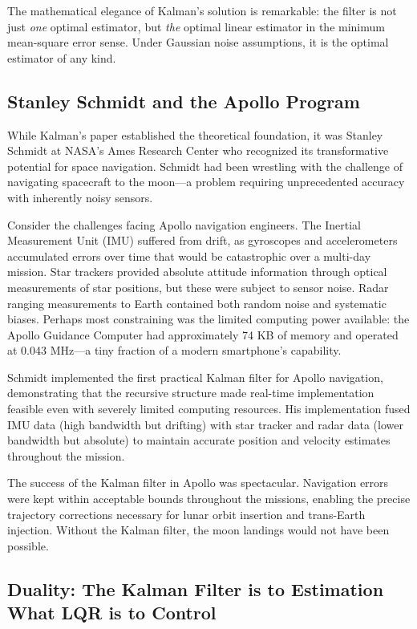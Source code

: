 The mathematical elegance of Kalman's solution is remarkable: the filter is not just \textit{one} optimal estimator, but \textit{the} optimal linear estimator in the minimum mean-square error sense. Under Gaussian noise assumptions, it is the optimal estimator of any kind.

\subsection{Stanley Schmidt and the Apollo Program}

While Kalman's paper established the theoretical foundation, it was Stanley Schmidt at NASA's Ames Research Center who recognized its transformative potential for space navigation. Schmidt had been wrestling with the challenge of navigating spacecraft to the moon---a problem requiring unprecedented accuracy with inherently noisy sensors.

Consider the challenges facing Apollo navigation engineers. The Inertial Measurement Unit (IMU) suffered from drift, as gyroscopes and accelerometers accumulated errors over time that would be catastrophic over a multi-day mission. Star trackers provided absolute attitude information through optical measurements of star positions, but these were subject to sensor noise. Radar ranging measurements to Earth contained both random noise and systematic biases. Perhaps most constraining was the limited computing power available: the Apollo Guidance Computer had approximately 74 KB of memory and operated at 0.043 MHz---a tiny fraction of a modern smartphone's capability.

Schmidt implemented the first practical Kalman filter for Apollo navigation, demonstrating that the recursive structure made real-time implementation feasible even with severely limited computing resources. His implementation fused IMU data (high bandwidth but drifting) with star tracker and radar data (lower bandwidth but absolute) to maintain accurate position and velocity estimates throughout the mission.

The success of the Kalman filter in Apollo was spectacular. Navigation errors were kept within acceptable bounds throughout the missions, enabling the precise trajectory corrections necessary for lunar orbit insertion and trans-Earth injection. Without the Kalman filter, the moon landings would not have been possible.

\subsection{Duality: The Kalman Filter is to Estimation What LQR is to Control}

